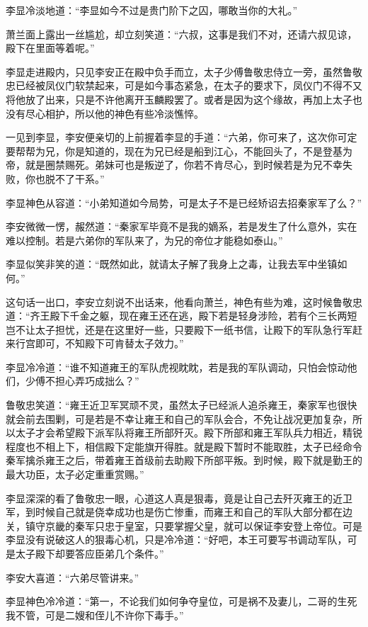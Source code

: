 李显冷淡地道：“李显如今不过是贵门阶下之囚，哪敢当你的大礼。”

萧兰面上露出一丝尴尬，却立刻笑道：“六叔，这事是我们不对，还请六叔见谅，殿下在里面等着呢。”

李显走进殿内，只见李安正在殿中负手而立，太子少傅鲁敬忠侍立一旁，虽然鲁敬忠已经被凤仪门软禁起来，可是如今事态紧急，在太子的要求下，凤仪门不得不又将他放了出来，只是不许他离开玉麟殿罢了。或者是因为这个缘故，再加上太子也没有尽心相护，所以他的神色有些冷淡憔悴。

一见到李显，李安便亲切的上前握着李显的手道：“六弟，你可来了，这次你可定要帮帮为兄，你是知道的，现在为兄已经是船到江心，不能回头了，不是登基为帝，就是圈禁赐死。弟妹可也是叛逆了，你若不肯尽心，到时候若是为兄不幸失败，你也脱不了干系。”

李显神色从容道：“小弟知道如今局势，可是太子不是已经矫诏去招秦家军了么？”

李安微微一愣，赧然道：“秦家军毕竟不是我的嫡系，若是发生了什么意外，实在难以控制。若是六弟你的军队来了，为兄的帝位才能稳如泰山。”

李显似笑非笑的道：“既然如此，就请太子解了我身上之毒，让我去军中坐镇如何。”

这句话一出口，李安立刻说不出话来，他看向萧兰，神色有些为难，这时候鲁敬忠道：“齐王殿下千金之躯，现在雍王还在逃，殿下若是轻身涉险，若有个三长两短岂不让太子担忧，还是在这里好一些，只要殿下一纸书信，让殿下的军队急行军赶来行宫即可，不知殿下可肯替太子效力。”

李显冷冷道：“谁不知道雍王的军队虎视眈眈，若是我的军队调动，只怕会惊动他们，少傅不担心弄巧成拙么？”

鲁敬忠笑道：“雍王近卫军冥顽不灵，虽然太子已经派人追杀雍王，秦家军也很快就会前去围剿，可是若是不幸让雍王和自己的军队会合，不免让战况更加复杂，所以太子才会希望殿下派军队将雍王所部歼灭。殿下所部和雍王军队兵力相近，精锐程度也不相上下，相信殿下定能旗开得胜。就是殿下暂时不能取胜，太子已经命令秦军擒杀雍王之后，带着雍王首级前去助殿下所部平叛。到时候，殿下就是勤王的最大功臣，太子必定重重赏赐。”

李显深深的看了鲁敬忠一眼，心道这人真是狠毒，竟是让自己去歼灭雍王的近卫军，到时候自己就是侥幸成功也是伤亡惨重，而雍王和自己的军队大部分都在边关，镇守京畿的秦军只忠于皇室，只要掌握父皇，就可以保证李安登上帝位。可是李显没有说破这人的狠毒心机，只是冷冷道：“好吧，本王可要写书调动军队，可是太子殿下却要答应臣弟几个条件。”

李安大喜道：“六弟尽管讲来。”

李显神色冷冷道：“第一，不论我们如何争夺皇位，可是祸不及妻儿，二哥的生死我不管，可是二嫂和侄儿不许你下毒手。”

